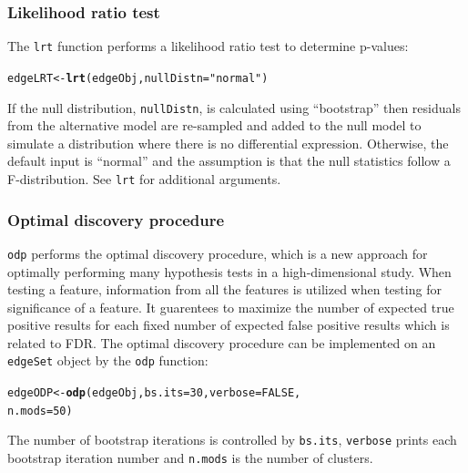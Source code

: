 \documentclass{article}\usepackage[]{graphicx}\usepackage[]{color}
\makeatletter
\newcommand{\hlnum}[1]{\textcolor[rgb]{0.686,0.059,0.569}{#1}}%
\newcommand{\hlstr}[1]{\textcolor[rgb]{0.192,0.494,0.8}{#1}}%
\newcommand{\hlstd}[1]{\textcolor[rgb]{0.345,0.345,0.345}{#1}}%
\newcommand{\hlkwb}[1]{\textcolor[rgb]{0.69,0.353,0.396}{#1}}%
\newcommand{\hlkwc}[1]{\textcolor[rgb]{0.333,0.667,0.333}{#1}}%
\newcommand{\hlkwd}[1]{\textcolor[rgb]{0.737,0.353,0.396}{\textbf{#1}}}%
\newenvironment{kframe}{%
 \def\at@end@of@kframe{}%
 \ifinner\ifhmode%
  \def\at@end@of@kframe{\end{minipage}}%
  \begin{minipage}{\columnwidth}%
 \fi\fi%
 \def\FrameCommand##1{\hskip\@totalleftmargin \hskip-\fboxsep
 \colorbox{shadecolor}{##1}\hskip-\fboxsep
     \hskip-\linewidth \hskip-\@totalleftmargin \hskip\columnwidth}%
 \MakeFramed {\advance\hsize-\width
   \@totalleftmargin\z@ \linewidth\hsize
   \@setminipage}}%
 {\par\unskip\endMakeFramed%
 \at@end@of@kframe}
\newenvironment{knitrout}{}{} %
\makeatother
\begin{document}
\subsubsection{Likelihood ratio test}
The {\tt lrt} function performs a likelihood ratio test to determine p-values:
\begin{knitrout}
\color{fgcolor}\begin{kframe}
\begin{alltt}
\hlstd{edgeLRT} \hlkwb{<-} \hlkwd{lrt}\hlstd{(edgeObj,} \hlkwc{nullDistn} \hlstd{=} \hlstr{"normal"}\hlstd{)}
\end{alltt}
\end{kframe}
\end{knitrout}
If the null distribution, {\tt nullDistn}, is calculated using ``bootstrap'' then residuals from the alternative model are re-sampled and added to the null model to simulate a distribution where there is no differential expression. Otherwise, the default input is ``normal'' and the assumption is that the null statistics follow a F-distribution. See {\tt lrt} for additional arguments.



\subsubsection{Optimal discovery procedure}
{\tt odp} performs the optimal discovery procedure, which is a new approach for optimally performing many hypothesis tests in a high-dimensional study. When testing a feature, information from all the features is utilized when testing for significance of a feature. It guarentees to maximize the number of expected true positive results for each fixed number of expected false positive results which is related to FDR. The optimal discovery procedure can be implemented on an {\tt edgeSet} object by the {\tt odp} function:
\begin{knitrout}
\color{fgcolor}\begin{kframe}
\begin{alltt}
\hlstd{edgeODP} \hlkwb{<-} \hlkwd{odp}\hlstd{(edgeObj,} \hlkwc{bs.its} \hlstd{=} \hlnum{30}\hlstd{,} \hlkwc{verbose} \hlstd{=} \hlnum{FALSE}\hlstd{,}
    \hlkwc{n.mods} \hlstd{=} \hlnum{50}\hlstd{)}
\end{alltt}
\end{kframe}
\end{knitrout}
The number of bootstrap iterations is controlled by {\tt bs.its}, {\tt verbose} prints each bootstrap iteration number and {\tt n.mods} is the number of clusters. 
\end{document}
